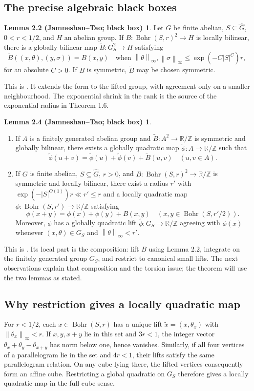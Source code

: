 \documentclass[11pt,a4paper]{article}
\newcommand{\T}{\mathbb R/\mathbb Z}
\newcommand{\Gh}{\widehat G}
\newcommand{\Bohr}{\operatorname{Bohr}}
\newcommand{\norm}[1]{\left\|#1\right\|}
\newcommand{\JT}[1]{\cite[#1]{JT}}
\theoremstyle{definition}
\newtheorem*{liftlemma}{Lemma 2.2 (Jamneshan--Tao; black box)}
\newtheorem*{integrationlemma}{Lemma 2.4 (Jamneshan--Tao; black box)}
\numberwithin{equation}{section}
\begin{document}
\subsection{The precise algebraic black boxes}
\begin{liftlemma}
Let $G$ be finite abelian, $S\subseteq\Gh$, $0<r<1/2$, and $H$
an abelian group. If $B:\Bohr(S,r)^2\to H$ is locally bilinear,
there is a globally bilinear map $\widetilde B:G_S^2\to H$ satisfying
\[
\widetilde B((x,\theta),(y,\sigma))=B(x,y)
\quad\text{when }\norm{\theta}_\infty,\norm{\sigma}_\infty\leq
\exp(-C|S|^C)r,
\]
for an absolute $C>0$. If $B$ is symmetric, $\widetilde B$ may be
chosen symmetric.
\end{liftlemma}
This is \JT{Lemma 2.2}. It extends the form to the lifted group, with
agreement only on a smaller neighbourhood. The exponential shrink in
the rank is the source of the exponential radius in Theorem 1.6.

\begin{integrationlemma}
\leavevmode
\begin{enumerate}
\item If $A$ is a finitely generated abelian group and
$\widetilde B:A^2\to\T$ is symmetric and globally bilinear, there
exists a globally quadratic map $\widetilde\phi:A\to\T$ such that
\[
\widetilde\phi(u+v)=\widetilde\phi(u)+\widetilde\phi(v)+\widetilde B(u,v)
\quad(u,v\in A).
\]
\item If $G$ is finite abelian, $S\subseteq\Gh$, $r>0$, and
$B:\Bohr(S,r)^2\to\T$ is symmetric and locally bilinear, there
exist a radius $r'$ with
$\exp(-|S|^{O(1)})r\ll r'\leq r$ and a locally quadratic map
$\phi:\Bohr(S,r')\to\T$ satisfying
\[
\phi(x+y)=\phi(x)+\phi(y)+B(x,y)
\quad(x,y\in\Bohr(S,r'/2)).
\]
Moreover, $\phi$ has a globally quadratic lift
$\widetilde\phi:G_S\to\T$ agreeing with $\phi(x)$ whenever
$(x,\theta)\in G_S$ and $\norm{\theta}_\infty<r'$.
\end{enumerate}
\end{integrationlemma}
This is \JT{Lemma 2.4}. Its local part is the composition: lift $B$
using Lemma 2.2, integrate on the finitely generated group $G_S$, and
restrict to canonical small lifts. The next observations explain that
composition and the torsion issue; the theorem will use the two lemmas
as stated.

\subsection{Why restriction gives a locally quadratic map}
For $r<1/2$, each $x\in\Bohr(S,r)$ has a unique lift
$\widetilde x=(x,\theta_x)$ with $\norm{\theta_x}_\infty<r$.
If $x,y,x+y$ lie in this set and $3r<1$, the integer vector
$\theta_x+\theta_y-\theta_{x+y}$ has norm below one, hence vanishes.
Similarly, if all four vertices of a parallelogram lie in the set and
$4r<1$, their lifts satisfy the same parallelogram relation. On any cube
lying there, the lifted vertices consequently form an affine cube.
Restricting a global quadratic on $G_S$ therefore gives a locally
quadratic map in the full cube sense.
\end{document}

